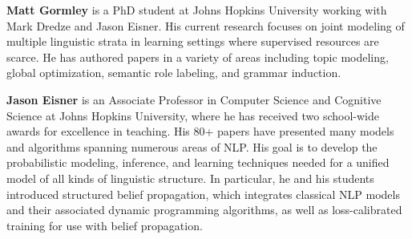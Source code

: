 \begin{bio}
{\bfseries Matt Gormley} is a PhD student at Johns Hopkins University working with Mark Dredze and Jason Eisner. His current research focuses on joint modeling of multiple linguistic strata in learning settings where supervised resources are scarce. He has authored papers in a variety of areas including topic modeling, global optimization, semantic role labeling, and grammar induction.

{\bfseries Jason Eisner} is an Associate Professor in Computer Science and Cognitive Science at Johns Hopkins University, where he has received two school-wide awards for excellence in teaching. His 80+ papers have presented many models and algorithms spanning numerous areas of NLP. His goal is to develop the probabilistic modeling, inference, and learning techniques needed for a unified model of all kinds of linguistic structure. In particular, he and his students introduced structured belief propagation, which integrates classical NLP models and their associated dynamic programming algorithms, as well as loss-calibrated training for use with belief propagation.
\end{bio}

